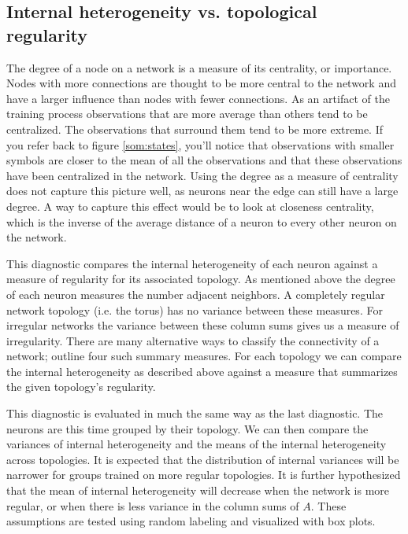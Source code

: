 \subsection{Internal heterogeneity vs. topological regularity}
The degree of a node on a network is a measure of its centrality, or
importance. Nodes with more connections are thought to be more central to the
network and have a larger influence than nodes with fewer connections. As an
artifact of the training process observations that are more average than
others tend to be centralized.  The observations that surround them tend to be
more extreme.  If you refer back to figure \ref{som:states}, you'll notice
that observations with smaller symbols are closer to the mean of all the
observations and that these observations have been centralized in the network.
Using the degree as a measure of centrality does not capture this picture
well, as neurons near the edge can still have a large degree.  A way to
capture this effect would be to look at closeness centrality, which is the
inverse of the average distance of a neuron to every other neuron on the
network.


This diagnostic compares the internal heterogeneity of each neuron against a
measure of regularity for its associated topology.  As mentioned above the
degree of each neuron measures the number adjacent neighbors.  A
completely regular network topology (i.e. the torus) has no variance
between these measures.  For irregular networks the variance between these
column sums gives us a measure of irregularity. There are many alternative
ways to classify the connectivity of a network; \cite{florax95} outline four
such summary measures.  For each topology we can compare the internal
heterogeneity as described above against a measure that summarizes the given
topology's regularity.

This diagnostic is evaluated in much the same way as the last diagnostic.  
The neurons are this time grouped by their topology.  We can then
compare the variances of internal heterogeneity and the means of the internal
heterogeneity across topologies.  It is expected that the distribution of internal
variances will be narrower for groups trained on more regular topologies.
It is further hypothesized that the mean of internal heterogeneity will
decrease when the network is more regular, or when there is less variance in
the column sums of $A$.  These assumptions are tested using random labeling
and visualized with box plots.

